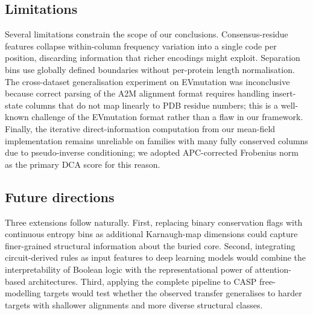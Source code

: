 \subsection{Limitations}
Several limitations constrain the scope of our conclusions.  Consensus-residue
features collapse within-column frequency variation into a single code per
position, discarding information that richer encodings might exploit.
Separation bins use globally defined boundaries without per-protein length
normalisation.  The cross-dataset generalisation experiment on EVmutation was
inconclusive because correct parsing of the A2M alignment format requires
handling insert-state columns that do not map linearly to PDB residue numbers;
this is a well-known challenge of the EVmutation format rather than a flaw in
our framework.  Finally, the iterative direct-information computation from
our mean-field implementation remains unreliable on families with many fully
conserved columns due to pseudo-inverse conditioning; we adopted APC-corrected
Frobenius norm as the primary DCA score for this reason.

\subsection{Future directions}
Three extensions follow naturally.  First, replacing binary conservation flags
with continuous entropy bins as additional Karnaugh-map dimensions could
capture finer-grained structural information about the buried core.  Second,
integrating circuit-derived rules as input features to deep learning models
would combine the interpretability of Boolean logic with the representational
power of attention-based architectures.  Third, applying the complete pipeline
to CASP free-modelling targets would test whether the observed transfer
generalises to harder targets with shallower alignments and more diverse
structural classes.
